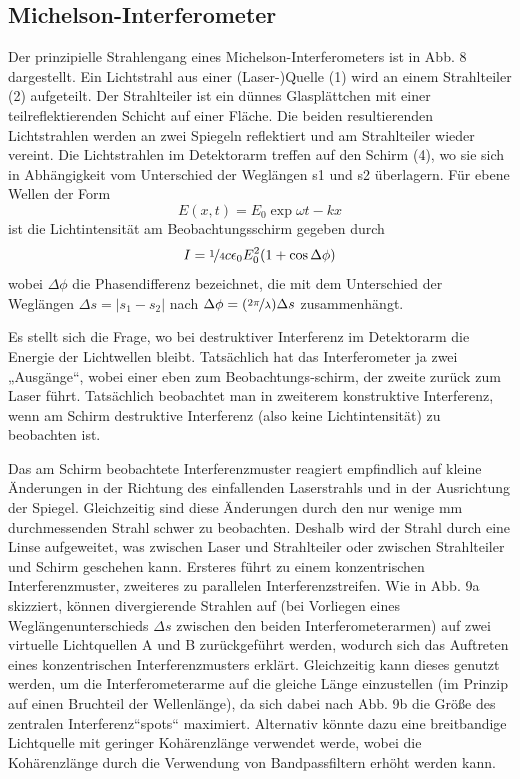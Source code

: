 \documentclass[ngerman]{scrartcl}
\begin{document}
\subsection{Michelson-Interferometer} %
\label{sec:grundlagen_michelson_interferometer}
Der prinzipielle Strahlengang eines Michelson-Interferometers ist in Abb. 8 dargestellt. Ein Lichtstrahl aus einer (Laser-)Quelle (1) wird an einem Strahlteiler (2) aufgeteilt. Der Strahlteiler ist ein dünnes Glasplättchen mit einer teilreflektierenden Schicht auf einer Fläche. Die beiden resultierenden Lichtstrahlen werden an zwei Spiegeln reflektiert und am Strahlteiler wieder vereint. Die Lichtstrahlen im Detektorarm treffen auf den Schirm (4), wo sie sich in Abhängigkeit vom Unterschied der Weglängen s1 und s2 überlagern. Für ebene Wellen der Form
\begin{equation}
    E(x,t) = E_0 \exp{\omega t - k x}
\end{equation}
ist die Lichtintensität am Beobachtungsschirm gegeben durch
\begin{equation}
    I = \nicefrac{1}{4} c \epsilon_0 E_0^2 (1+\cos{\Delta \phi})
\end{equation}
wobei $\Delta \phi$ die Phasendifferenz bezeichnet, die mit dem Unterschied der Weglängen $\Delta s = \left| s_1  - s_2 \right|$ nach $\Delta \phi = (\nicefrac{2 \pi}{\lambda})\Delta s$ zusammenhängt. 

Es stellt sich die Frage, wo bei destruktiver Interferenz im Detektorarm die Energie der Lichtwellen bleibt. Tatsächlich hat das Interferometer ja zwei „Ausgänge“, wobei einer eben zum Beobachtungs-schirm, der zweite zurück zum Laser führt. Tatsächlich beobachtet man in zweiterem konstruktive Interferenz, wenn am Schirm destruktive Interferenz (also keine Lichtintensität) zu beobachten ist.

Das am Schirm beobachtete Interferenzmuster reagiert empfindlich auf kleine Änderungen in der Richtung des einfallenden Laserstrahls und in der Ausrichtung der Spiegel. Gleichzeitig sind diese Änderungen durch den nur wenige mm durchmessenden Strahl schwer zu beobachten. Deshalb wird der Strahl durch eine Linse aufgeweitet, was zwischen Laser und Strahlteiler oder zwischen Strahlteiler und Schirm geschehen kann. Ersteres führt zu einem konzentrischen Interferenzmuster, zweiteres zu parallelen Interferenzstreifen. Wie in Abb. 9a skizziert, können divergierende Strahlen auf (bei Vorliegen eines Weglängenunterschieds $\Delta s$ zwischen den beiden Interferometerarmen) auf zwei virtuelle Lichtquellen A und B zurückgeführt werden, wodurch sich das Auftreten eines konzentrischen Interferenzmusters erklärt. Gleichzeitig kann dieses genutzt werden, um die Interferometerarme auf die gleiche Länge einzustellen (im Prinzip auf einen Bruchteil der Wellenlänge), da sich dabei nach Abb. 9b die Größe des zentralen Interferenz“spots“ maximiert. Alternativ könnte dazu eine breitbandige Lichtquelle mit geringer Kohärenzlänge verwendet werde, wobei die Kohärenzlänge durch die Verwendung von Bandpassfiltern erhöht werden kann.
\end{document}

